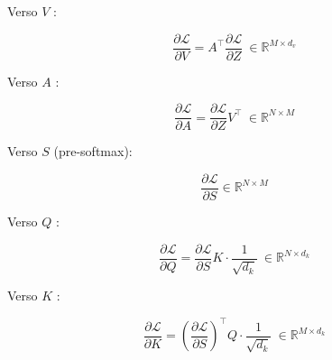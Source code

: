 \documentclass[
  11pt,
]{article}
\begin{document}
Verso \(V\) :

\[\frac{\partial\mathcal{L}}{\partial V} = A^{\top}\frac{\partial\mathcal{L}}{\partial Z}\  \in \mathbb{R}^{M \times d_{v}}\]

Verso \(A\) :

\[\frac{\partial\mathcal{L}}{\partial A} = \frac{\partial\mathcal{L}}{\partial Z}V^{\top}\  \in \mathbb{R}^{N \times M}\]

Verso \(S\) (pre-softmax):

\[\frac{\partial\mathcal{L}}{\partial S} \in \mathbb{R}^{N \times M}\]

Verso \(Q\) :

\[\frac{\partial\mathcal{L}}{\partial Q} = \frac{\partial\mathcal{L}}{\partial S}K \cdot \frac{1}{\sqrt{d_{k}}}\  \in \mathbb{R}^{N \times d_{k}}\]

Verso \(K\) :

\[\frac{\partial\mathcal{L}}{\partial K} = \left( \frac{\partial\mathcal{L}}{\partial S} \right)^{\top}Q \cdot \frac{1}{\sqrt{d_{k}}}\  \in \mathbb{R}^{M \times d_{k}}\]
\end{document}
